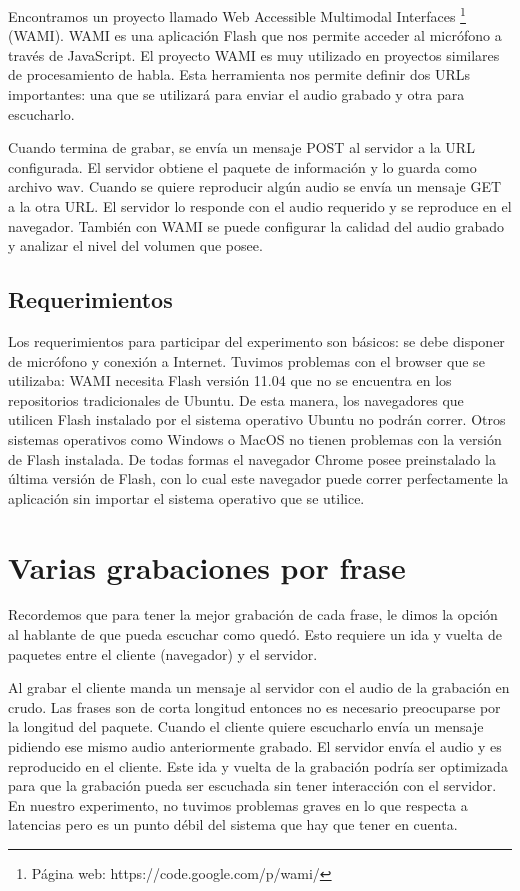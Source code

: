 Encontramos un proyecto llamado Web Accessible Multimodal Interfaces \footnote{Página web: https://code.google.com/p/wami/} (WAMI). WAMI es una aplicación Flash que nos permite acceder al micrófono a través de JavaScript. El proyecto WAMI es muy utilizado en proyectos similares de procesamiento de habla. Esta herramienta nos permite definir dos URLs importantes: una que se utilizará para enviar el audio grabado y otra para escucharlo.  

Cuando termina de grabar, se envía un mensaje POST al servidor a la URL configurada. El servidor obtiene el paquete de información y lo guarda como archivo wav. Cuando se quiere reproducir algún audio se envía un mensaje GET a la otra URL. El servidor lo responde con el audio requerido y se reproduce en el navegador. También con WAMI se puede configurar la calidad del audio grabado y analizar el nivel del volumen que posee. 

\subsection{Requerimientos}

Los requerimientos para participar del experimento son básicos: se debe disponer de micrófono y conexión a Internet. Tuvimos problemas con el browser que se utilizaba: WAMI necesita Flash versión 11.04 que no se encuentra en los repositorios tradicionales de Ubuntu. De esta manera, los navegadores que utilicen Flash instalado por el sistema operativo Ubuntu no podrán correr. Otros sistemas operativos como Windows o MacOS no tienen problemas con la versión de Flash instalada. De todas formas el navegador Chrome posee preinstalado la última versión de Flash, con lo cual este navegador puede correr perfectamente la aplicación sin importar el sistema operativo que se utilice.

\section{Varias grabaciones por frase}

Recordemos que para tener la mejor grabación de cada frase, le dimos la opción al hablante de que pueda escuchar como quedó. Esto requiere un ida y vuelta de paquetes entre el cliente (navegador) y el servidor. 

Al grabar el cliente manda un mensaje al servidor con el audio de la grabación en crudo. Las frases son de corta longitud entonces no es necesario preocuparse por la longitud del paquete. Cuando el cliente quiere escucharlo envía un mensaje pidiendo ese mismo audio anteriormente grabado. El servidor envía el audio y es reproducido en el cliente. Este ida y vuelta de la grabación podría ser optimizada para que la grabación pueda ser escuchada sin tener interacción con el servidor. En nuestro experimento, no tuvimos problemas graves en lo que respecta a latencias pero es un punto débil del sistema que hay que tener en cuenta.

